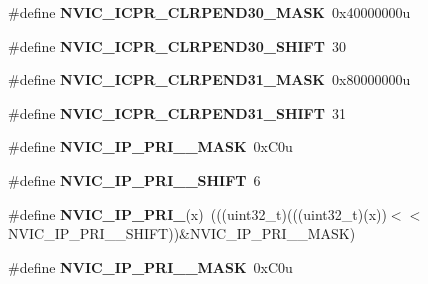 \begin{DoxyCompactItemize}
\#define {\bfseries N\+V\+I\+C\+\_\+\+I\+C\+P\+R\+\_\+\+C\+L\+R\+P\+E\+N\+D30\+\_\+\+M\+A\+SK}~0x40000000u
\item 
\mbox{\label{group___n_v_i_c___register___masks_ga1f8e92056d3c1870e25416ea68f736dc}} 
\#define {\bfseries N\+V\+I\+C\+\_\+\+I\+C\+P\+R\+\_\+\+C\+L\+R\+P\+E\+N\+D30\+\_\+\+S\+H\+I\+FT}~30
\item 
\mbox{\label{group___n_v_i_c___register___masks_ga0cb0970f1e920f2abb4d4e82379c1355}} 
\#define {\bfseries N\+V\+I\+C\+\_\+\+I\+C\+P\+R\+\_\+\+C\+L\+R\+P\+E\+N\+D31\+\_\+\+M\+A\+SK}~0x80000000u
\item 
\mbox{\label{group___n_v_i_c___register___masks_ga6b5fb4e0d86798967c73141e1bd285d9}} 
\#define {\bfseries N\+V\+I\+C\+\_\+\+I\+C\+P\+R\+\_\+\+C\+L\+R\+P\+E\+N\+D31\+\_\+\+S\+H\+I\+FT}~31
\item 
\mbox{\label{group___n_v_i_c___register___masks_ga6cee347aa0bb97ccc21803927e8d30eb}} 
\#define {\bfseries N\+V\+I\+C\+\_\+\+I\+P\+\_\+\+P\+R\+I\+\_\+\_\+\+M\+A\+SK}~0x\+C0u
\item 
\mbox{\label{group___n_v_i_c___register___masks_gaef770ca3c368b767bc1210e8363ff0f7}} 
\#define {\bfseries N\+V\+I\+C\+\_\+\+I\+P\+\_\+\+P\+R\+I\+\_\+\_\+\+S\+H\+I\+FT}~6
\item 
\mbox{\label{group___n_v_i_c___register___masks_ga609b78ced3f231e068404111f7f6c091}} 
\#define {\bfseries N\+V\+I\+C\+\_\+\+I\+P\+\_\+\+P\+R\+I\+\_}(x)~(((uint32\+\_\+t)(((uint32\+\_\+t)(x))$<$$<$N\+V\+I\+C\+\_\+\+I\+P\+\_\+\+P\+R\+I\+\_\+\_\+\+S\+H\+I\+FT))\&N\+V\+I\+C\+\_\+\+I\+P\+\_\+\+P\+R\+I\+\_\+\_\+\+M\+A\+SK)
\item 
\mbox{\label{group___n_v_i_c___register___masks_gaf2a6877536fd82000d2715df7092b410}} 
\#define {\bfseries N\+V\+I\+C\+\_\+\+I\+P\+\_\+\+P\+R\+I\+\_\+\_\+\+M\+A\+SK}~0x\+C0u
\item 
\mbox{\label{group___n_v_i_c___register___masks_ga0c17fc2a8ba9c9a060fa8633ce2d58ce}} 
$$
\end{DoxyCompactItemize}
